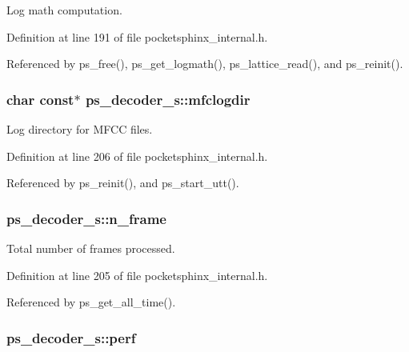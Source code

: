 \-Log math computation. 



\-Definition at line 191 of file pocketsphinx\-\_\-internal.\-h.



\-Referenced by ps\-\_\-free(), ps\-\_\-get\-\_\-logmath(), ps\-\_\-lattice\-\_\-read(), and ps\-\_\-reinit().

\subsubsection[{mfclogdir}]{\setlength{\rightskip}{0pt plus 5cm}char const$\ast$ {\bf ps\-\_\-decoder\-\_\-s\-::mfclogdir}}\label{structps__decoder__s_a8bb5ef8791798b8dd9bc82b1ec016663}


\-Log directory for \-M\-F\-C\-C files. 



\-Definition at line 206 of file pocketsphinx\-\_\-internal.\-h.



\-Referenced by ps\-\_\-reinit(), and ps\-\_\-start\-\_\-utt().

\subsubsection[{n\-\_\-frame}]{ {\bf ps\-\_\-decoder\-\_\-s\-::n\-\_\-frame}}\label{structps__decoder__s_a2886b321c576c7def449ebb2f37899fd}


\-Total number of frames processed. 



\-Definition at line 205 of file pocketsphinx\-\_\-internal.\-h.



\-Referenced by ps\-\_\-get\-\_\-all\-\_\-time().

\subsubsection[{perf}]{ {\bf ps\-\_\-decoder\-\_\-s\-::perf}}\label{structps__decoder__s_ab42d1d1e300d2a6df5dd3cd796a27d43}


